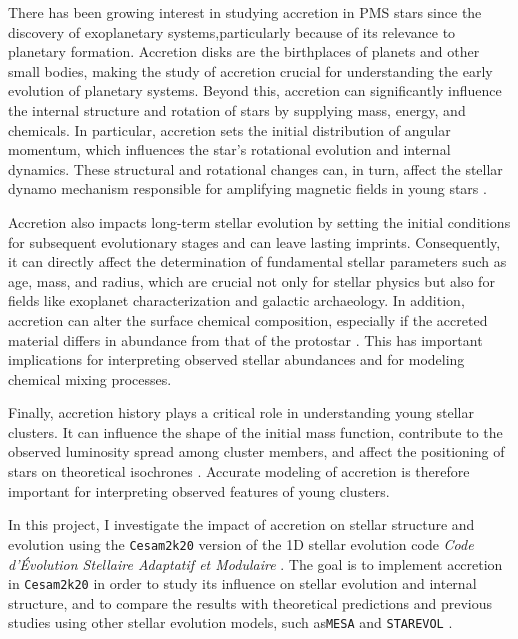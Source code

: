 \documentclass[12pt,a4paper]{article}
\begin{document}
There has been growing interest in studying accretion in PMS stars since the discovery of exoplanetary systems,particularly because of its relevance to planetary formation. Accretion disks are the birthplaces of planets and other small bodies, making the study of accretion crucial for understanding the early evolution of planetary systems. Beyond this, accretion can significantly influence the internal structure and rotation of stars by supplying mass, energy, and chemicals. In particular, accretion sets the initial distribution of angular momentum, which influences the star's rotational evolution and internal dynamics. These structural and rotational changes can, in turn, affect the stellar dynamo mechanism responsible for amplifying magnetic fields in young stars \parencite[e.g.,][]{StelzerNeuhauser2001}. 

Accretion also impacts long-term stellar evolution by setting the initial conditions for subsequent evolutionary stages and can leave lasting imprints. Consequently, it can directly affect the determination of fundamental stellar parameters such as age, mass, and radius, which are crucial not only for stellar physics but also for fields like exoplanet characterization and galactic archaeology. In addition, accretion can alter the surface chemical composition, especially if the accreted material differs in abundance from that of the protostar \parencite{KunitomoGuillot2021}. This has important implications for interpreting observed stellar abundances and for modeling chemical mixing processes.

Finally, accretion history plays a critical role in understanding young stellar clusters. It can influence the shape of the initial mass function, contribute to the observed luminosity spread among cluster members, and affect the positioning of stars on theoretical isochrones \parencite{BaraffeEtAl2009,BaraffeEtAl2012,HosokawaEtAl2011}. Accurate modeling of accretion is therefore important for interpreting observed features of young clusters.

In this project, I investigate the impact of accretion on stellar structure and evolution using the \texttt{Cesam2k20} version of the 1D stellar evolution code \textit{Code d'Évolution Stellaire Adaptatif et Modulaire} \parencite[\texttt{CESAM}; ][]{Morel1997,MorelLebreton2008,MarquesEtAl2013}. The goal is to implement accretion in \texttt{Cesam2k20} in order to study its influence on stellar evolution and internal structure, and to compare the results with theoretical predictions and previous studies using other stellar evolution models, such as\texttt{MESA} \parencite{KunitomoEtAl2017} and \texttt{STAREVOL} \parencite{AmardMatt2023}.
\end{document}
